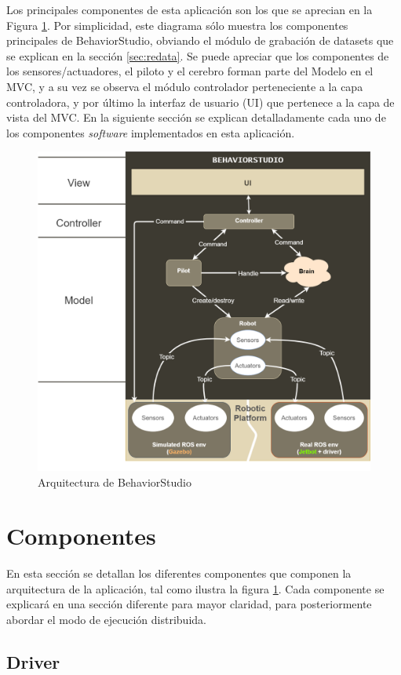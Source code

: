 Los principales componentes de esta aplicación son los que se aprecian en la Figura \ref{fig:architecture}. Por simplicidad, este diagrama sólo muestra los componentes principales de BehaviorStudio, obviando el módulo de grabación de datasets que se explican en la sección \ref{sec:redata}. Se puede apreciar que los componentes de los sensores/actuadores, el piloto y el cerebro forman parte del Modelo en el MVC, y a su vez se observa el módulo controlador perteneciente a la capa controladora, y por último la interfaz de usuario (UI) que pertenece a la capa de vista del MVC. En la siguiente sección se explican detalladamente cada uno de los componentes \textit{software} implementados en esta aplicación.

\begin{figure}
  \centering
  \includegraphics[width=.7\linewidth]{img/arquitectura}
  \caption{Arquitectura de BehaviorStudio}
  \label{fig:architecture}
\end{figure}

\section{Componentes}
\label{sec:components}

En esta sección se detallan los diferentes componentes que componen la arquitectura de la aplicación, tal como ilustra la figura \ref{fig:architecture}. Cada componente se explicará en una sección diferente para mayor claridad, para posteriormente abordar el modo de ejecución distribuida.

\subsection{Driver}
\label{sec:driver}

